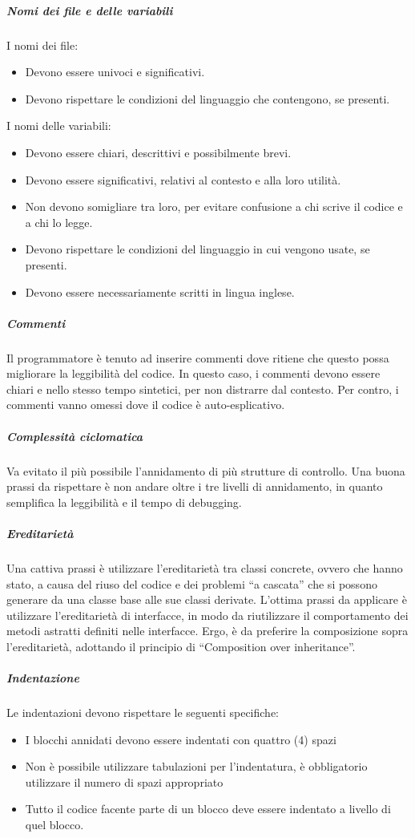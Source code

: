 \documentclass[../../norme-di-progetto.tex]{subfiles}
\begin{document}
\subparagraph{Nomi dei file e delle variabili}%
\label{subp:nomi_file_e_variabili}
I nomi dei file:
\begin{itemize}
  \item Devono essere univoci e significativi.
  \item Devono rispettare le condizioni del linguaggio che contengono, se presenti.
\end{itemize}
I nomi delle variabili:
\begin{itemize}
  \item Devono essere chiari, descrittivi e possibilmente brevi.
  \item Devono essere significativi, relativi al contesto e alla loro utilità.
  \item Non devono somigliare tra loro, per evitare confusione a chi scrive il codice e a chi lo legge.
  \item Devono rispettare le condizioni del linguaggio in cui vengono usate, se presenti.
  \item Devono essere necessariamente scritti in lingua inglese.
\end{itemize}

\subparagraph{Commenti}%
\label{subp:commenti}
Il programmatore è tenuto ad inserire commenti dove ritiene che questo possa migliorare la leggibilità del codice.
In questo caso, i commenti devono essere chiari e nello stesso tempo sintetici, per non distrarre dal contesto.
Per contro, i commenti vanno omessi dove il codice è auto-esplicativo.

\subparagraph{Complessità ciclomatica}%
\label{subp:complessita_ciclomatica}
Va evitato il più possibile l’annidamento di più strutture di controllo.
Una buona prassi da rispettare è non andare oltre i tre livelli di annidamento, in quanto semplifica la leggibilità e il tempo di debugging.

\subparagraph{Ereditarietà}%
\label{subp:ereditarieta}
Una cattiva prassi è utilizzare l’ereditarietà tra classi concrete, ovvero che hanno stato, a causa del riuso del codice e dei problemi ``a cascata'' che si possono generare da una classe base alle sue classi derivate.
L'ottima prassi da applicare è utilizzare l'ereditarietà di interfacce, in modo da riutilizzare il comportamento dei metodi astratti definiti nelle interfacce.
Ergo, è da preferire la composizione sopra l'ereditarietà, adottando il principio di “Composition over inheritance”.

\subparagraph{Indentazione}%
\label{subp:indentazione}
Le indentazioni devono rispettare le seguenti specifiche:
\begin{itemize}
  \item I blocchi annidati devono essere indentati con quattro (4) spazi
  \item Non è possibile utilizzare tabulazioni per l'indentatura, è obbligatorio utilizzare il numero di spazi appropriato
  \item Tutto il codice facente parte di un blocco deve essere indentato a livello di quel blocco.
\end{itemize}
\end{document}

